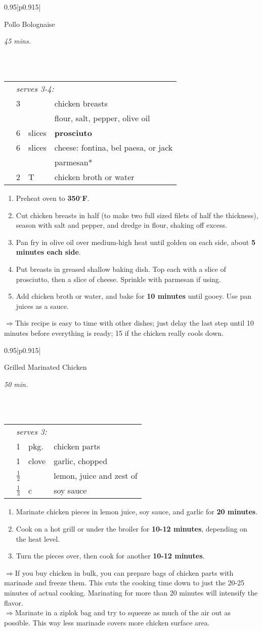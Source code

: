 \documentclass[8pt]{report}
\newcommand{\ingredmargin}{0.25cm}
\newcommand{\F}{$^\circ$F}
\newenvironment{recipe}[3]
  {\bigskip \bigskip 
\begin{tabular*}{0.95\textwidth}{|p{0.915\textwidth}|} \hline \vspace{0.25mm}
\begin{minipage}{0.7\textwidth}	\begin{flushleft} {\Large \textsf{#1}} \end{flushleft} \end{minipage}
\begin{minipage}{0.2\textwidth} \begin{flushright} \emph{#2} \end{flushright} \end{minipage} \\ \\ \hline
\begin{ingreds}{#3} \addcontentsline{toc}{section}{#1} \phantomsection \label{rec:#1}} 
  {\\ \hline \end{tabular*} \noindent}
\newenvironment{ingreds}[1]
  {\begin{tabular}{lrlp{0.6\textwidth}} \hspace{\ingredmargin} & \multicolumn{3}{l}{\it #1:} \\}
  {\end{tabular} \medskip}
\newcommand{\ingredsdone}{\end{ingreds}\begin{enumerate}}
\newcommand{\stepsdone}{\end{enumerate} \medskip}
\newcommand{\ingredient}[3]{\hspace{\ingredmargin} & #1 & #2 & #3 \\}
\newcommand{\tip}{$\Rightarrow$}
\begin{document}
\begin{recipe}{Pollo Bolognaise}{45 mins.}{serves 3-4}
\index{pollo bolognaise} \index{bolognaise!pollo bolognaise}
\index{chicken!pollo bolognaise}
\ingredient{3}{}{chicken breasts}
\ingredient{}{}{flour, salt, pepper, olive oil}
\ingredient{6}{slices}{\bf prosciuto}
\ingredient{6}{slices}{cheese: fontina, bel paesa, or jack}
\ingredient{}{}{parmesan*}
\ingredient{2}{T}{chicken broth or water}
\ingredsdone
\item Preheat oven to {\bf 350\F}.
\item Cut chicken breasts in half (to make two full sized filets of half the thickness), season with salt and pepper, and dredge in flour, shaking off excess.
\item Pan fry in olive oil over medium-high heat until golden on each side, about {\bf 5 minutes each side}.
\item Put breasts in greased shallow baking dish.  Top each with a slice of prosciutto, then a slice of cheese.  Sprinkle with parmesan if using.
\item Add chicken broth or water, and bake for {\bf 10 minutes} until gooey.  Use pan juices as a sauce.
\stepsdone
\noindent \tip This recipe is easy to time with other dishes; just delay the last step until 10 minutes before everything is ready; 15 if the chicken really cools down.  
\end{recipe}


\begin{recipe}{Grilled Marinated Chicken}{50 min.}{serves 3}
\index{chicken!marinated}
\ingredient{1}{pkg.}{chicken parts}
\ingredient{1}{clove}{garlic, chopped}
\ingredient{$\frac12$}{}{lemon, juice and zest of}
\ingredient{$\frac13$}{c}{soy sauce}
\ingredsdone
\item Marinate chicken pieces in lemon juice, soy sauce, and garlic for {\bf 20 minutes}.
\item Cook on a hot grill or under the broiler for {\bf 10-12 minutes}, depending on the heat level.  
\item Turn the pieces over, then cook for another {\bf 10-12 minutes}.
\stepsdone
\noindent \tip If you buy chicken in bulk, you can prepare bags of chicken parts with marinade and freeze them.  This cuts the cooking time down to just the 20-25 minutes of actual cooking.  Marinating for more than 20 minutes will intensify the flavor.\\
\tip Marinate in a ziplok bag and try to squeeze as much of the air out as possible.  This way less marinade covers more chicken surface area.
\end{recipe}
\end{document}
